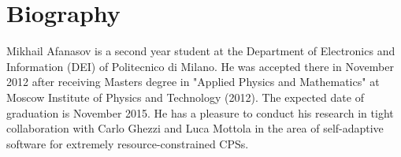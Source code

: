 \section{Biography}

Mikhail Afanasov is a second year student at the Department of Electronics and
Information (DEI) of Politecnico di Milano. He was accepted there in November
2012 after receiving Masters degree in "Applied Physics and Mathematics" at
Moscow Institute of Physics and Technology (2012). The expected date of
graduation is November 2015. He has a pleasure to conduct his research in tight
collaboration with Carlo Ghezzi and Luca Mottola in the area of self-adaptive
software for extremely resource-constrained CPSs.
